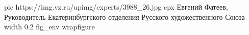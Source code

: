  
 
 
 
 
\ifcmt
  pic https://img.vz.ru/upimg/experts/3988_26.jpg
  cpx Евгений Фатеев, Руководитель Екатеринбургского отделения Русского художественного Союза
  width 0.2
  fig_env wrapfigure
\fi

